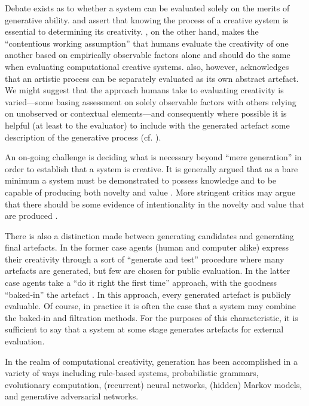 \documentclass[phd,electronic,oneside,twosidetoc,letterpaper,chaptercenter,parttop,lof,lot]{byumsphd}
\begin{document}
Debate exists as to whether a system can be evaluated solely on the merits of generative ability. \citeauthor{Boden2003TheEdition} \cite{Boden2003TheEdition} and \citeauthor{kasof1995explaining} \cite{kasof1995explaining} assert that knowing the process of a creative system is essential to determining its creativity. \citet{Ritchie2007}, on the other hand, makes the ``contentious working assumption'' that humans evaluate the creativity of one another based on empirically observable factors alone and should do the same when evaluating computational creative systems. \citeauthor{Ritchie2007} also, however, acknowledges that an artistic process can be separately evaluated as its own abstract artefact. We might suggest that the approach humans take to evaluating creativity is varied---some basing assessment on solely observable factors with others relying on unobserved or contextual elements---and consequently where possible it is helpful (at least to the evaluator) to include with the generated artefact some description of the generative process (cf. \cite{colton2008creativity}).

An on-going challenge is deciding what is necessary beyond ``mere generation'' in order to establish that a system is creative. It is generally argued that as a bare minimum a system must be demonstrated to possess knowledge and to be capable of producing both novelty and value \citep{Boden2003TheEdition}. More stringent critics may argue that there should be some evidence of intentionality in the novelty and value that are produced \citep{Ventura2017HowSystem}.

There is also a distinction made between generating candidates and generating final artefacts. In the former case agents (human and computer alike) express their creativity through a sort of ``generate and test'' procedure where many artefacts are generated, but few are chosen for public evaluation. In the latter case agents take a ``do it right the first time'' approach, with the goodness ``baked-in'' the artefact \citep{Ventura2016}. In this approach, every generated artefact is publicly evaluable. Of course, in practice it is often the case that a system may combine the baked-in and filtration methods. For the purposes of this characteristic, it is sufficient to say that a system at some stage generates artefacts for external evaluation.

In the realm of computational creativity, generation has been accomplished in a variety of ways including rule-based systems, probabilistic grammars, evolutionary computation, (recurrent) neural networks, (hidden) Markov models, and generative adversarial networks.
\end{document}
